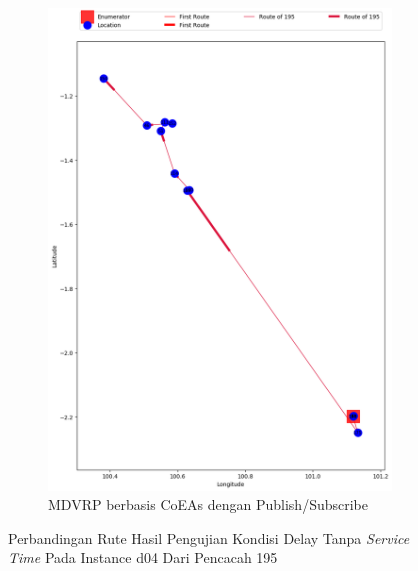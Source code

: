 \begin{figure}[H]\ContinuedFloat
	\centering
	\begin{subfigure}[t]{\textwidth}
		\centering
		\includegraphics[width=\textwidth]{Resources/Images/delayed_5/real_m15_n100_delayed_5_195_pubsub_coes}
		\caption{MDVRP berbasis CoEAs dengan Publish/Subscribe}
		\label{fig:real_m15_n100_delayed_5_195_pubsub_coes}
	\end{subfigure}
	\caption{Perbandingan Rute Hasil Pengujian Kondisi Delay Tanpa \textit{Service Time} Pada Instance d04 Dari Pencacah 195}
	\label{fig:real_m15_n100_delayed_5_195_contd}
\end{figure}


